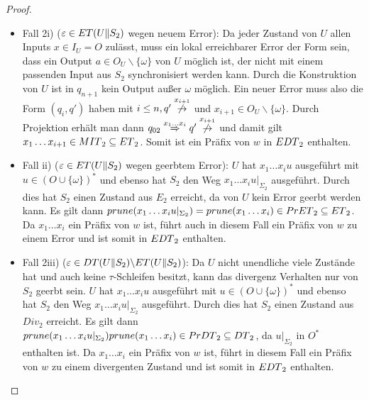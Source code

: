 \begin{proof}
\begin{itemize}
\begin{itemize}
        \item Fall 2i) ($\varepsilon\in ET{}(U\|S_2)$ wegen neuem Error): Da
          jeder Zustand von $U$ allen Inputs $x\in I_U=O$ zulässt, muss ein
          lokal erreichbarer Error der Form sein, dass ein Output $a\in
          O_U\backslash\{\omega\}$ von $U$ möglich ist, der nicht mit einem
          passenden Input aus $S_2$ synchronisiert werden kann. Durch die
          Konstruktion von $U$ ist in $q_{n+1}$ kein Output außer $\omega$
          möglich. Ein neuer Error muss also die Form $(q_i,q')$ haben mit
          $i\leq n, q' \overset{x_{i+1}}{\not{\hspace{-0.1cm}\rightarrow}}$ und
          $x_{i+1}\in O_U\backslash\{\omega\}$. Durch Projektion erhält man
          dann $q_{02} \overset{x_1\dots x_i}{\Rightarrow} q'
          \overset{x_{i+1}}{\not{\hspace{-0.1cm}\rightarrow}}$ und damit gilt
          $x_1\dots x_{i+1}\in MIT{}_2\subseteq ET{}_2$. Somit ist ein Präfix
          von $w$ in $EDT{}_2$ enthalten.
        \item Fall ii) ($\varepsilon\in ET{}(U\|S_2)$ wegen geerbtem Error):
          $U$ hat $x_1\dots x_iu$ ausgeführt mit $u\in (O\cup\{\omega\})^*$ und
          ebenso hat $S_2$ den Weg $x_1\dots x_iu|_{\Sigma _2}$ ausgeführt.
          Durch dies hat $S_2$ einen Zustand aus $E_2$ erreicht, da von $U$
          kein Error geerbt werden kann. Es gilt dann $prune{}(x_1\dots
          x_iu|_{\Sigma _2})= prune{}(x_1\dots x_i)\in PrET{}_2\subseteq
          ET{}_2$. Da $x_1\dots x_i$ ein Präfix von $w$ ist, führt auch in
          diesem Fall ein Präfix von $w$ zu einem Error und ist somit in
          $EDT{}_2$ enthalten.
        \item Fall 2iii) ($\varepsilon\in DT{}(U\|S_2)\backslash
          ET{}(U\|S_2)$): Da $U$ nicht unendliche viele Zustände hat und auch
          keine $\tau$-Schleifen besitzt, kann das divergenz Verhalten nur von
          $S_2$ geerbt sein. $U$ hat $x_1\dots x_iu$ ausgeführt mit $u\in
          (O\cup \{\omega\})^*$ und ebenso hat $S_2$ den Weg $x_1\dots
          x_iu|_{\Sigma _2}$ ausgeführt. Durch dies hat $S_2$ einen Zustand aus
          $Div_2$ erreicht. Es gilt dann $prune{}(x_1\dots x_iu|_{\Sigma
          _2})prune{}(x_1\dots x_i)\in PrDT{}_2\subseteq DT{}_2$, da
          $u|_{\Sigma _2}$ in $O^*$ enthalten ist. Da $x_1\dots x_i$ ein Präfix
          von $w$ ist, führt in diesem Fall ein Präfix von $w$ zu einem
          divergenten Zustand und ist somit in $EDT{}_2$ enthalten.
      \end{itemize}
  \end{itemize}


\end{proof}
